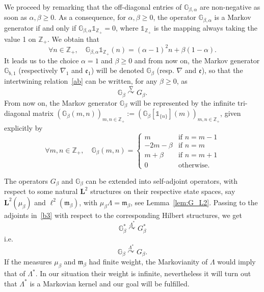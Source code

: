 \documentclass[10pt]{amsart}
\theoremstyle{definition}\newtheorem{defi}[theo]{Definition}\newtheorem{rema}[theo]{Remark}\newtheorem{exam}[theo]{Example}\newtheorem{exem}[theo]{Example}\newtheorem{nota}[theo]{Notation}
\newcommand{\df}{\mathrel{:=}}
\newcommand{\ZZ}{\mathbb{Z}}
\newcommand{\fe}{\mathfrak{e}}
\newcommand{\fm}{\mathfrak{m}}
\newcommand{\na}{\nabla}
\newcommand{\un}{\mathds{1}}
\newcommand{\dBg}{{\discret{G}}}
\newcommand{\Bg}{G}
\newcommand{\esL}{\mathbf{L}}
\newcommand{\esLd}{\ell}
\newcommand{\discret}[1]{\mathds{#1}}
\newcommand{\adjL}{\Lambda^*}
\newcommand{\Gate}[3]{#1\stackrel{#2}{\curvearrowright}#3}
\let\oldforall\forall
\renewcommand*{\forall}{\mathrel{\oldforall}}
\begin{document}
We proceed by remarking that the off-diagonal entries of $\dBg_{\beta,\alpha}$ are non-negative as soon as $\alpha, \beta\geq 0$. As a consequence, for $\alpha, \beta\geq 0$, the operator $\dBg_{\beta,\alpha}$ is a Markov generator if and only if $\dBg_{\beta,\alpha}\un_{\ZZ_+}=0$, where $\un_{\ZZ_+}$ is the mapping always taking the value 1 on $\ZZ_+$. We obtain that
\[
\forall n\in\ZZ_+,\quad \dBg_{\beta,\alpha}\un_{\ZZ_+}(n)=(\alpha-1)^2n+\beta(1-\alpha).
\]
It leads us to the choice $\alpha=1$ and $\beta\geq 0$ and from now on, the Markov generator $\dBg_{b,1}$ (respectively $\na_1$ and $\fe_1$) will be denoted $\dBg_{\beta}$ (resp. $\na$ and $\fe$), so that the intertwining relation~\eqref{ab} can be written, for any $\beta\geq 0$, as
\begin{equation}\label{bb}
\Gate{\dBg_{\beta}}{\na}{\Bg_{\beta}}.
\end{equation}
From now on, the Markov generator $\dBg_{\beta}$ will be represented by the infinite tri-diagonal matrix $(\dBg_{\beta}(m,n))_{m,n\in\ZZ_+}\df (\dBg_{\beta}[\un_{\{n\}}](m))_{m,n\in\ZZ_+}$, given explicitly by
\begin{equation}\label{dBg}
\forall m,n\in \ZZ_+,\quad
\dBg_{\beta}(m,n)=
\begin{cases}
m&\text{if $n=m-1$}\\
-2m-\beta&\text{if $n=m$}\\
m+\beta&\text{if $n=m+1$}\\
0&\text{otherwise.}
\end{cases}
\end{equation}

The operators $\Bg_{\beta}$ and $\dBg_{\beta}$ can be extended into self-adjoint operators, with respect to some natural $\esL^2$ structures on their respective state spaces, say $\esL^2(\mu_{\beta})$ and $\esLd^2(\fm_{\beta})$, with $\mu_{\beta}\Lambda=\fm_{\beta}$, see Lemma~\ref{lem:G_L2}. Passing to the adjoints in~\eqref{b3} with respect to the corresponding Hilbert structures, we get
\begin{equation}\label{dd1}
\Gate{\dBg_{\beta}^*}{\adjL}{\Bg_{\beta}^*}
\end{equation}
i.e.
\begin{equation}\label{dd2}
\Gate{\dBg_{\beta}}{\adjL}{\Bg_{\beta}}.
\end{equation}
If the measures $\mu_{\beta}$ and $\fm_{\beta}$ had finite weight, the Markovianity of $\Lambda$ would imply that of $\adjL$. In our situation their weight is infinite, nevertheless it will turn out that $\adjL$ is a Markovian kernel and our goal will be fulfilled.
\end{document}
